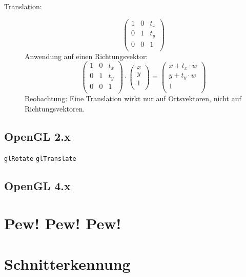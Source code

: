 \documentclass{article}
\begin{document}
\begin{description}
 \item[Translation:]
  \begin{equation}
   \left(\begin{array}{ccc}
    1 & 0 & t_{x} \\
    0 & 1 & t_{y} \\
    0 & 0 & 1 \\
   \end{array}\right)
  \end{equation}
  Anwendung auf einen Richtungsvektor:
  \begin{equation}
   \left(\begin{array}{ccc}
    1 & 0 & t_{x} \\
    0 & 1 & t_{y} \\
    0 & 0 & 1 \\
   \end{array}\right)
   \cdot
   \left(\begin{array}{ccc}
    x \\
    y \\
    1 \\
   \end{array}\right)
   =
   \left(\begin{array}{ccc}
    x + t_{x} \cdot w \\
    y + t_{y} \cdot w \\
    1 \\
   \end{array}\right)
  \end{equation}
  Beobachtung:
  Eine Translation wirkt nur auf Ortsvektoren,
  nicht auf Richtungsvektoren.
\end{description}

\subsection{OpenGL 2.x}
\texttt{glRotate}
\texttt{glTranslate}

\subsection{OpenGL 4.x}


\section{Pew! Pew! Pew!}

\section{Schnitterkennung}
\end{document}
